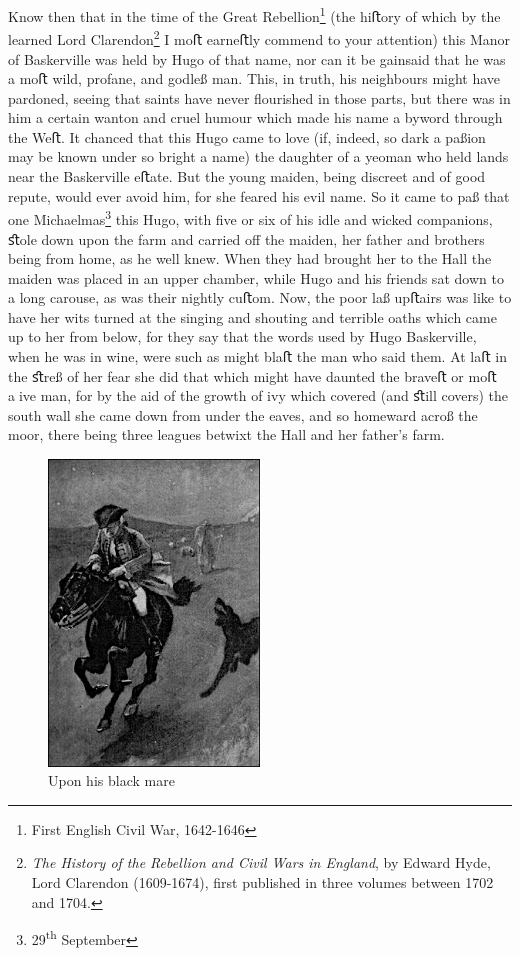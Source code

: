 \documentclass[paper=5.5in:8.5in,BCOR=7mm,twoside,DIV=calc,12pt,usegeometry,openany,chapterprefix,endperiod,headings=big]{scrbook} %
\begin{document}
Know then that in the time of the Great Rebellion\footnote{First English Civil War, 1642-1646} (the hiﬅory of which by the learned Lord Clarendon\footnote{\textit{The History of the Rebellion and Civil Wars in England}, by Edward Hyde, Lord Clarendon (1609-1674), first published in three volumes between 1702 and 1704.} I moﬅ earneﬅly commend to your attention) this Manor of Baskerville was held by Hugo of that name, nor can it be gainsaid that he was a moﬅ wild, profane, and godleß man. This, in truth, his neighbours might have pardoned, seeing that saints have never ﬂourished in those parts, but there was in him a certain wanton and cruel humour which made his name a byword through the Weﬅ. It chanced that this Hugo came to love (if, indeed, so dark a paßion may be known under so bright a name) the daughter of a yeoman who held lands near the Baskerville eﬅate. But the young maiden, being discreet and of good repute, would ever avoid him, for she feared his evil name. So it came to paß that one Michaelmas\footnote{29\textsuperscript{th} September} this Hugo, with ﬁve or six of his idle and wicked companions, ﬆole down upon the farm and carried oﬀ the maiden, her father and brothers being from home, as he well knew. When they had brought her to the Hall the maiden was placed in an upper chamber, while Hugo and his friends sat down to a long carouse, as was their nightly cuﬅom. Now, the poor laß upﬅairs was like to have her wits turned at the singing and shouting and terrible oaths which came up to her from below, for they say that the words used by Hugo Baskerville, when he was in wine, were such as might blaﬅ the man who said them. At laﬅ in the ﬆreß of her fear she did that which might have daunted the braveﬅ or moﬅ aive man, for by the aid of the growth of ivy which covered (and ﬆill covers) the south wall she came down from under the eaves, and so homeward acroß the moor, there being three leagues betwixt the Hall and her father's farm.

\begin{figure}
\centering
\includegraphics[width=0.5\textwidth]{02_blackmare}
\caption{Upon his black mare}
\end{figure}
\end{document}
